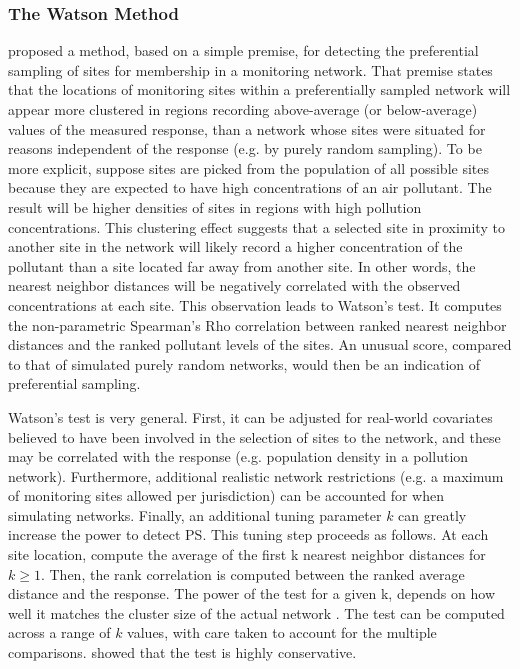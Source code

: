 \documentclass{article}
\begin{document}
\subsubsection*{The Watson Method} \label{subsubsec:WatsonPrefSample}
\cite{watson2020} proposed a method, based on a simple premise, for detecting the preferential sampling of  sites for membership in a monitoring network. That premise states that the locations of monitoring sites within a preferentially sampled network will appear more clustered in regions recording above-average (or below-average) values of the measured response, than a network whose sites were situated for reasons independent of the response (e.g. by purely random sampling).
To be more explicit, suppose sites are picked from the population of all possible sites because they are expected to have high concentrations of an air pollutant. The result will be higher densities of sites in regions with high pollution concentrations.  This clustering effect suggests that a selected site in proximity to another site in the network will likely record a higher concentration of the pollutant than a site located far away from another site.
In other words, the  nearest neighbor distances will be negatively correlated with the observed concentrations at each site. 
This observation leads to Watson's test. It computes the non-parametric Spearman's Rho correlation between ranked nearest neighbor distances and the ranked pollutant levels of the sites. An unusual score, compared to that of simulated purely random networks, would then be an indication of preferential sampling.

Watson's test \cite{watson2019} is very general. First, it can be adjusted for real-world covariates believed to have been involved in the selection of sites to the network, and these may be correlated with the response (e.g. population density in a pollution network). Furthermore, additional realistic network restrictions (e.g. a maximum of monitoring sites allowed per jurisdiction) can be accounted for when simulating networks. Finally, an additional tuning parameter $k$ can greatly increase the power to detect PS. This tuning step proceeds as follows. At each site location, compute the average of the first \gls{k} nearest neighbor distances for $ k \geq 1$. Then, the rank correlation is computed between the ranked average distance and the response. The power of the test for a given \gls{k}, depends on how well it matches the cluster size of the actual network \citep{watson2020}. The test can be computed across a range of $k$ values, with care taken to account for the multiple comparisons. \citet{watson2020} showed that the test is highly conservative.   
\end{document}
